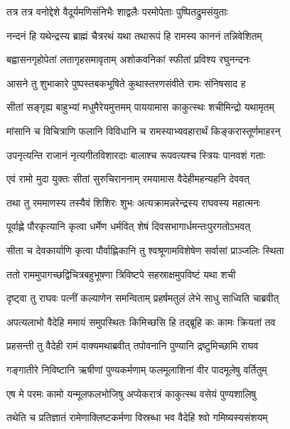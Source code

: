 \twolineshloka
{तत्र तत्र वनोद्देशे वैदूर्यमणिसंनिभैः}
{शाद्वलैः परमोपेताः पुष्पितद्रुमसंयुताः} %

\twolineshloka
{नन्दनं हि यथेन्द्रस्य ब्राह्मं चैत्ररथं यथा}
{तथारूपं हि रामस्य काननं तन्निवेशितम्} %

\twolineshloka
{बह्वासनगृहोपेतां लतागृहसमावृताम्}
{अशोकवनिकां स्फीतां प्रविश्य रघुनन्दनः} %

\twolineshloka
{आसने तु शुभाकारे पुष्पस्तबकभूषिते}
{कुथास्तरणसंवीते रामः संनिषसाद ह} %

\twolineshloka
{सीतां सङ्गृह्य बाहुभ्यां मधुमैरेयमुत्तमम्}
{पाययामास काकुत्स्थः शचीमिन्द्रो यथामृतम्} %

\twolineshloka
{मांसानि च विचित्राणि फलानि विविधानि च}
{रामस्याभ्यवहारार्थं किङ्करास्तूर्णमाहरन्} %

\twolineshloka
{उपनृत्यन्ति राजानं नृत्यगीतविशारदाः}
{बालाश्च रूपवत्यश्च स्त्रियः पानवशं गताः} %

\twolineshloka
{एवं रामो मुदा युक्तः सीतां सुरुचिराननाम्}
{रमयामास वैदेहीमहन्यहनि देववत्} %

\twolineshloka
{तथा तु रममाणस्य तस्यैवं शिशिरः शुभः}
{अत्यक्रामन्नरेन्द्रस्य राघवस्य महात्मनः} %

\twolineshloka
{पूर्वाह्णे पौरकृत्यानि कृत्वा धर्मेण धर्मवित्}
{शेषं दिवसभागार्धमन्तःपुरगतोऽभवत्} %

\twolineshloka
{सीता च देवकार्याणि कृत्वा पौर्वाह्णिकानि तु}
{श्वश्रूणामविशेषेण सर्वासां प्राञ्जलिः स्थिता} %

\twolineshloka
{ततो राममुपागच्छद्विचित्रबहुभूषणा}
{त्रिविष्टपे सहस्राक्षमुपविष्टं यथा शची} %

\twolineshloka
{दृष्ट्वा तु राघवः पत्नीं कल्याणेन समन्विताम्}
{प्रहर्षमतुलं लेभे साधु साध्विति चाब्रवीत्} %

\twolineshloka
{अपत्यलाभो वैदेहि ममायं समुपस्थितः}
{किमिच्छसि हि तद्ब्रूहि कः कामः क्रियतां तव} %

\twolineshloka
{प्रहसन्ती तु वैदेही रामं वाक्यमथाब्रवीत्}
{तपोवनानि पुण्यानि द्रष्टुमिच्छामि राघव} %

\twolineshloka
{गङ्गातीरे निविष्टानि ऋषीणां पुण्यकर्मणाम्}
{फलमूलाशिनां वीर पादमूलेषु वर्तितुम्} %

\twolineshloka
{एष मे परमः कामो यन्मूलफलभोजिषु}
{अप्येकरात्रं काकुत्स्थ वसेयं पुण्यशालिषु} %

\twolineshloka
{तथेति च प्रतिज्ञातं रामेणाक्लिष्टकर्मणा}
{विस्रब्धा भव वैदेहि श्वो गमिष्यस्यसंशयम्} %

